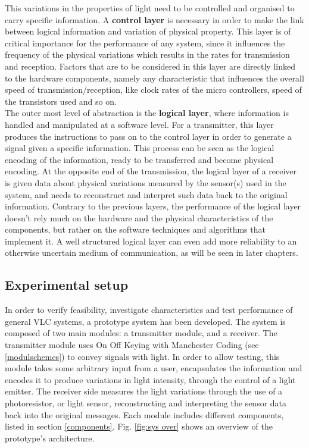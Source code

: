 This variations in the properties of light need to be controlled and organised to carry specific information.
A \textbf{control layer} is necessary in order to make the link between logical information and variation of physical property.
This layer is of critical importance for the performance of any system, since it influences the frequency of the physical variations which results in the rates for transmission and reception.
Factors that are to be considered in this layer are directly linked to the hardware components, namely any characteristic that influences the overall speed of transmission/reception, like clock rates of the micro controllers, speed of the transistors used and so on.\\

The outer most level of abstraction is the \textbf{logical layer}, where information is handled and manipulated at a software level.
For a transmitter, this layer produces the instructions to pass on to the control layer in order to generate a signal given a specific information. 
This process can be seen as the logical encoding of the information, ready to be transferred and become physical encoding.
At the opposite end of the transmission, the logical layer of a receiver is given data about physical variations measured by the sensor(s) used in the system, and needs to reconstruct and interpret such data back to the original information.
Contrary to the previous layers, the performance of the logical layer doesn't rely much on the hardware and the physical characteristics of the components, but rather on the software techniques and algorithms that implement it.
A well structured logical layer can even add more reliability to an otherwise uncertain medium of communication, as will be seen in later chapters.


\subsection{Experimental setup}
\label{expsetup}
In order to verify feasibility, investigate characteristics and test performance of general VLC systems, a prototype system has been developed.
The system is composed of two main modules: a transmitter module, and a receiver.
The transmitter module uses On Off Keying with Manchester Coding (see \ref{modulschemes})  to convey signals with light.
In order to allow testing, this module takes some arbitrary input from a user, encapsulates the information and encodes it to produce variations in light intensity, through the control of a light emitter.
The receiver side measures the light variations through the use of a photoresistor, or light sensor, reconstructing and interpreting the sensor data back into the original messages. 
Each module includes different components, listed in section \ref{components}.
Fig. \ref{fig:sys over} shows an overview of the prototype's architecture.

